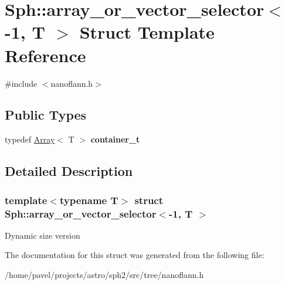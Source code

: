 \hypertarget{structSph_1_1array__or__vector__selector_3-1_00_01T_01_4}{}\section{Sph\+:\+:array\+\_\+or\+\_\+vector\+\_\+selector$<$-\/1, T $>$ Struct Template Reference}
\label{structSph_1_1array__or__vector__selector_3-1_00_01T_01_4}


{\ttfamily \#include $<$nanoflann.\+h$>$}

\subsection*{Public Types}
\begin{DoxyCompactItemize}
\item 
\hypertarget{structSph_1_1array__or__vector__selector_3-1_00_01T_01_4_a9459fb133d60702c309ec1c5522f2053}{}\label{structSph_1_1array__or__vector__selector_3-1_00_01T_01_4_a9459fb133d60702c309ec1c5522f2053} 
typedef \hyperlink{classArray}{Array}$<$ T $>$ {\bfseries container\+\_\+t}
\end{DoxyCompactItemize}


\subsection{Detailed Description}
\subsubsection*{template$<$typename T$>$\newline
struct Sph\+::array\+\_\+or\+\_\+vector\+\_\+selector$<$-\/1, T $>$}

Dynamic size version 

The documentation for this struct was generated from the following file\+:\begin{DoxyCompactItemize}
\item 
/home/pavel/projects/astro/sph2/src/tree/nanoflann.\+h\end{DoxyCompactItemize}
